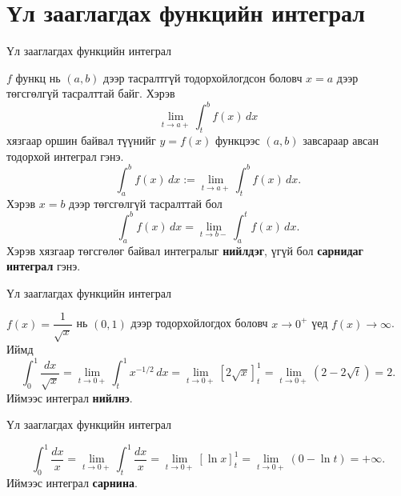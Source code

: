 \section{Үл зааглагдах функцийн интеграл}
\begin{frame}[allowframebreaks]{Үл зааглагдах функцийн интеграл}
\begin{definition}
$f$ функц нь $(a,b)$ дээр тасралтгүй тодорхойлогдсон боловч $x=a$ дээр төгсгөлгүй тасралттай байг.  
Хэрэв
\[
\lim_{t\to a+}\int_{t}^{b} f(x)\,dx
\]
хязгаар оршин байвал түүнийг $y=f(x)$ функцээс $(a,b)$ завсараар авсан тодорхой интеграл гэнэ.
\[
\int_{a}^{b} f(x)\,dx := \lim_{t\to a+}\int_{t}^{b}f(x)\,dx.
\]
Хэрэв $x=b$ дээр төгсгөлгүй тасралттай бол
\[
\int_a^{b}f(x)\,dx = \lim_{t\to b-}\int_{a}^{t} f(x)\,dx.
\]
Хэрэв хязгаар төгсгөлөг байвал интегралыг \textbf{нийлдэг}, үгүй бол \textbf{сарнидаг интеграл} гэнэ.
\end{definition}
\end{frame}

\begin{frame}[allowframebreaks]{Үл зааглагдах функцийн интеграл}
\begin{example}\label{x^{-1/2}}
$f(x) = \dfrac{1}{\sqrt{x}}$ нь $(0,1)$ дээр тодорхойлогдох боловч $x\to 0^{+}$ үед $f(x)\to\infty$.
Иймд 
\[
\int_{0}^{1}\frac{dx}{\sqrt{x}}
= \lim_{t\to0+}\int_{t}^{1} x^{-1/2}\,dx
= \lim_{t\to0+}\left[2\sqrt{x}\right]_{t}^{1}
= \lim_{t\to0+}(2 - 2\sqrt{t})
= 2.
\]
Иймээс интеграл \textbf{нийлнэ}.
\end{example}
\end{frame}

\begin{frame}[allowframebreaks]{Үл зааглагдах функцийн интеграл}
\begin{example}\label{x^-1}
\[
\int_{0}^{1}\frac{dx}{x}
= \lim_{t\to0+}\int_{t}^{1} \frac{dx}{x}
= \lim_{t\to0+} [\ln x]_{t}^{1}
= \lim_{t\to0+}(0 - \ln t)
= +\infty.
\]
Иймээс интеграл \textbf{сарнина}.
\end{example}
\end{frame}

